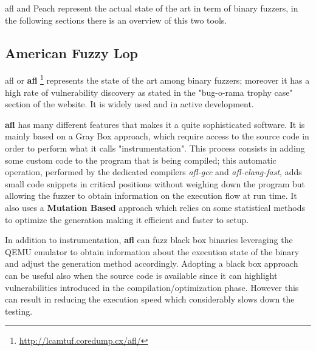 \documentclass[../main.tex]{subfiles}
\begin{document}
\acrlong{afl} and Peach represent the actual state of the art in term of binary fuzzers, in the following sections there is an overview of this two tools.

\subsection{American Fuzzy Lop}

\acrlong{afl} or \textbf{\acrshort{afl}} \footnote{\url{http://lcamtuf.coredump.cx/afl/}} represents the state of the art among binary fuzzers; moreover it has a high rate of vulnerability discovery as stated in the "bug-o-rama trophy case" section of the website. It is widely used and in active development.

\textbf{\acrshort{afl}} has many different features that makes it a quite sophisticated software. It is mainly based on a Gray Box approach, which require access to the source code in order to perform what it calls "instrumentation". This process consists in adding some custom code to the program that is being compiled; this automatic operation, performed by the dedicated compilers \textit{afl-gcc} and \textit{afl-clang-fast}, adds small code snippets in critical positions without weighing down the program but allowing the fuzzer to obtain information on the execution flow at run time. It also uses a \textbf{Mutation Based} approach which relies on  some statistical methods to optimize the generation making it efficient and faster to setup.

In addition to instrumentation, \textbf{\acrshort{afl}} can fuzz black box binaries leveraging the QEMU emulator to obtain information about the execution state of the binary and adjust the generation method accordingly. Adopting a black box approach can be useful also when the source code is available since it can highlight vulnerabilities introduced in the compilation/optimization phase. However this can result in reducing the execution speed which considerably slows down the testing.
\end{document}
